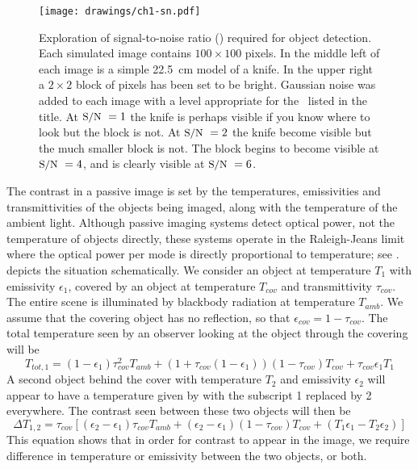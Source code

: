 \begin{figure}
\centering
\texttt{[image: drawings/ch1-sn.pdf]}
\caption[Signal-to-noise ratio for object detection]{
  Exploration of signal-to-noise ratio (\SN) required for object detection.
  Each simulated image contains $100 \times 100$ pixels.
  In the middle left of each image is a simple \SI{22.5}{\cm} model of a knife.
  In the upper right a $2\times2$ block of pixels has been set to be bright.
  Gaussian noise was added to each image with a level appropriate for the \SN\ listed in the title.
  At $\text{\small{S/N}}\ = 1$ the knife is perhaps visible if you know where to look but the block is not.
  At $\text{\small{S/N}}\ = 2$ the knife become visible but the much smaller block is not.
  The block begins to become visible at $\text{\small{S/N}}\ = 4$, and is clearly visible at $\text{\small{S/N}}\ = 6$.
}
\label{fig:ch1-sn}
\end{figure}

The contrast in a passive image is set by the temperatures, emissivities and transmittivities of the objects being imaged, along with the temperature of the ambient light.
Although passive imaging systems detect optical power, not the temperature of objects directly, these systems operate in the Raleigh-Jeans limit where the optical power per mode is directly proportional to temperature; see .
 depicts the situation schematically.
We consider an object at temperature $T_{1}$ with emissivity $\epsilon_1$, covered by an object at temperature $T_{cov}$ and transmittivity $\tau_{cov}$.
The entire scene is illuminated by blackbody radiation at temperature $T_{amb}$.
We assume that the covering object has no reflection, so that $\epsilon_{cov} = 1 - \tau_{cov}$.
The total temperature seen by an observer looking at the object through the covering will be
\begin{equation} \label{eqn:ch1-t-tot}
  T_{tot,1} = (1 - \epsilon_{1}) \tau_{cov}^2 T_{amb} + 
           (1 + \tau_{cov}(1 - \epsilon_{1}))(1-\tau_{cov}) T_{cov} + 
           \tau_{cov} \epsilon_{1} T_1
\end{equation}
A second object behind the cover with temperature $T_2$ and emissivity $\epsilon_2$ will appear to have a temperature given by  with the subscript 1 replaced by 2 everywhere.
The contrast seen between these two objects will then be
\begin{equation} \label{eqn:ch1-delta-t}
  \Delta T_{1,2} = \tau_{cov} \left[ (\epsilon_2 - \epsilon_1) \tau_{cov} T_{amb} + 
                                    (\epsilon_2 - \epsilon_1) (1-\tau_{cov}) T_{cov} + 
                                    (T_1 \epsilon_1 - T_2 \epsilon_2) \right]
\end{equation}
This equation shows that in order for contrast to appear in the image, we require difference in temperature or emissivity between the two objects, or both.

